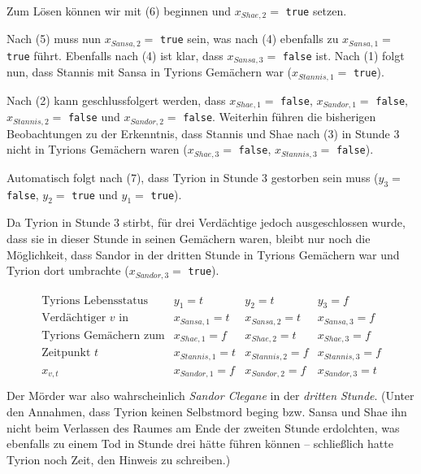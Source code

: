 \documentclass{article}
\begin{document}
Zum Lösen können wir mit (6) beginnen und $x_{Shae,2} = $ \texttt{true} setzen.

Nach (5) muss nun $x_{Sansa,2} = $ \texttt{true} sein, was nach (4) ebenfalls zu $x_{Sansa,1} = $ \texttt{true} führt. Ebenfalls nach (4) ist klar, dass $x_{Sansa,3} = $ \texttt{false} ist. Nach (1) folgt nun, dass Stannis mit Sansa in Tyrions Gemächern war ($x_{Stannis,1} = $ \texttt{true}). 

Nach (2) kann geschlussfolgert werden, dass $x_{Shae,1} = $ \texttt{false}, $x_{Sandor,1} = $ \texttt{false},  $x_{Stannis,2} = $ \texttt{false} und $x_{Sandor,2} = $ \texttt{false}. Weiterhin führen die bisherigen Beobachtungen zu der Erkenntnis, dass Stannis und Shae nach (3) in Stunde 3 nicht in Tyrions Gemächern waren ($x_{Shae,3} = $ \texttt{false}, $x_{Stannis,3} = $ \texttt{false}).

Automatisch folgt nach (7), dass Tyrion in Stunde 3 gestorben sein muss ($y_3= $\\\texttt{false}, $y_2= $ \texttt{true} und $y_1= $ \texttt{true}).

Da Tyrion in Stunde 3 stirbt, für drei Verdächtige jedoch ausgeschlossen wurde, dass sie in dieser Stunde in seinen Gemächern waren, bleibt nur noch die Möglichkeit, dass Sandor in der dritten Stunde in Tyrions Gemächern war und Tyrion dort umbrachte ($x_{Sandor,3} = $ \texttt{true}).

\begin{align*}
\begin{array}{l|lll}
\text{Tyrions Lebensstatus}        & y_1 = t & y_2 = t & y_3 = f \\
\hline
\text{Verdächtiger $v$ in}   & x_{Sansa,1}   = t & x_{Sansa,2}   = t & x_{Sansa,3}   = f \\ 
\text{Tyrions Gemächern zum} & x_{Shae,1}    = f & x_{Shae,2}    = t & x_{Shae,3}    = f \\
\text{Zeitpunkt $t$}         & x_{Stannis,1} = t & x_{Stannis,2} = f & x_{Stannis,3} = f \\
x_{v,t}                      & x_{Sandor,1}  = f & x_{Sandor,2}  = f & x_{Sandor,3}  = t \\
\end{array}
\end{align*}
Der Mörder war also wahrscheinlich \emph{Sandor Clegane} in der \emph{dritten Stunde}. (Unter den Annahmen, dass Tyrion keinen Selbstmord beging bzw. Sansa und Shae ihn nicht beim Verlassen des Raumes am Ende der zweiten Stunde erdolchten, was ebenfalls zu einem Tod in Stunde drei hätte führen können -- schließlich hatte Tyrion noch Zeit, den Hinweis zu schreiben.)
\end{document}
